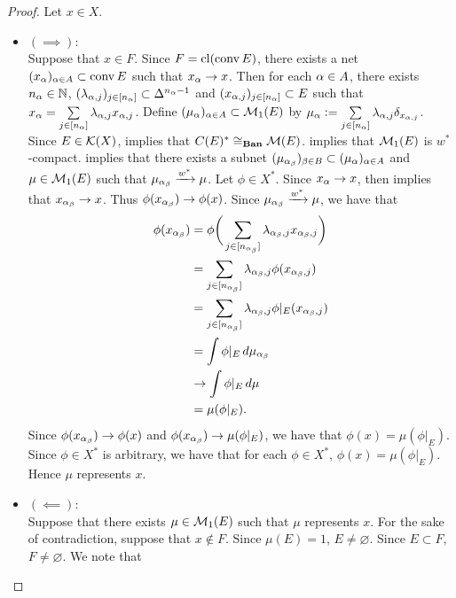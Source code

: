 \documentclass{book}
\begin{document}
	\begin{proof}
		Let $x \in X$. 
		\begin{itemize}
			\item $(\implies)$: \\
			Suppose that $x \in F$. Since $F = \operatorname{cl} (\operatorname{conv} E)$, there exists a net $(x_{\alpha})_{\alpha \in A} \subset \operatorname{conv} E$ such that $x_{\alpha} \rightarrow x$. Then for each $\alpha \in A$, there exists $n_{\alpha} \in \mathbb{N}$, $(\lambda_{\alpha, j})_{j \in [n_{\alpha}]} \subset \Delta^{n_{\alpha} - 1}$ and $(x_{\alpha, j})_{j \in [n_{\alpha}]} \subset E$ such that $x_{\alpha} = \sum\limits_{j \in [n_{\alpha}]} \lambda_{\alpha, j} x_{\alpha, j}$. Define $(\mu_{\alpha})_{\alpha \in A} \subset \mathcal{M}_1(E)$ by $\mu_{\alpha} \vcentcolon= \sum\limits_{j \in [n_{\alpha}]} \lambda_{\alpha, j} \delta_{x_{\alpha, j}}$. Since $E \in \mathcal{K}(X)$,  implies that $C(E)^* \cong_{\operatorname*{\text{\textbf{Ban}}}} \mathcal{M}(E)$.  implies that $\mathcal{M}_1(E)$ is $w^*$-compact.  implies that there exists a subnet $(\mu_{\alpha_{\beta}})_{\beta \in B} \subset (\mu_{\alpha})_{\alpha \in A}$ and $\mu \in \mathcal{M}_1(E)$ such that $\mu_{\alpha_{\beta}} \xrightarrow{w^*} \mu$. Let $\phi \in X^*$. Since $x_{\alpha} \rightarrow x$,  then implies that  $x_{\alpha_{\beta}} \rightarrow x$. Thus $\phi(x_{\alpha_{\beta}}) \rightarrow \phi(x)$. Since $\mu_{\alpha_{\beta}} \xrightarrow{w^*} \mu$, we have that 
			\begin{align*}
				\phi(x_{\alpha_{\beta}}) 
				& = \phi \bigg( \sum\limits_{j \in [n_{\alpha_{\beta}}]} \lambda_{\alpha_{\beta}, j} x_{\alpha_{\beta}, j} \bigg) \\
				& = \sum\limits_{j \in [n_{\alpha_{\beta}}]} \lambda_{\alpha_{\beta}, j} \phi(x_{\alpha_{\beta}, j}) \\
				& = \sum\limits_{j \in [n_{\alpha_{\beta}}]} \lambda_{\alpha_{\beta}, j} \phi|_E(x_{\alpha_{\beta}, j}) \\
				& = \int \phi|_E \, d \mu_{\alpha_{\beta}} \\
				& \rightarrow \int \phi|_E \, d \mu \\
				& = \mu(\phi|_E).
			\end{align*}
			Since $\phi(x_{\alpha_{\beta}}) \rightarrow \phi(x)$ and $\phi(x_{\alpha_{\beta}}) \rightarrow \mu (\phi|_E)$, we have that $\phi(x) = \mu (\phi|_E)$. Since $\phi \in X^*$ is arbitrary, we have that for each $\phi \in X^*$, $\phi(x) = \mu (\phi|_E)$. Hence $\mu$ represents $x$.  
			\item $(\impliedby)$: \\
			Suppose that there exists $\mu \in \mathcal{M}_1(E)$ such that $\mu$ represents $x$. For the sake of contradiction, suppose that $x \not \in F$. Since $\mu(E) = 1$, $E \neq \varnothing$. Since $E \subset F$, $F \neq \varnothing$. We note that  \begin{itemize}

\end{itemize}
\end{itemize}
\end{proof}
\end{document}
